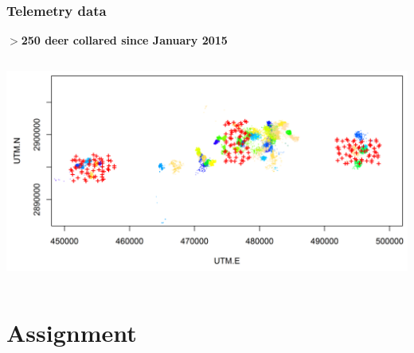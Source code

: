\documentclass[color=usenames,dvipsnames]{beamer}
\begin{document}






\begin{frame}
  \frametitle{Telemetry data}
  \centering
  \bf
  $>$250 deer collared since January 2015 \\
  \begin{columns}
    \column{\dimexpr\paperwidth-10pt}
    \includegraphics[width=\textwidth]{figs/camTelem}
  \end{columns}
\end{frame}





\section{Assignment}
\end{document}
